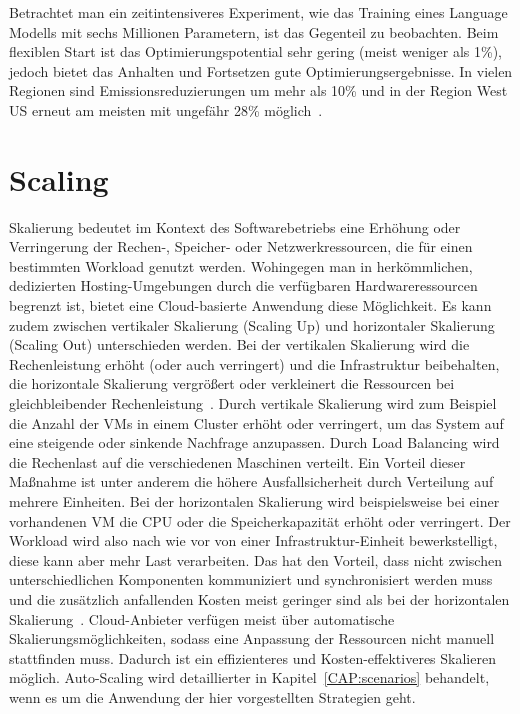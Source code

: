 Betrachtet man ein zeitintensiveres Experiment, wie das Training eines Language Modells mit sechs Millionen Parametern, ist das Gegenteil zu beobachten.
Beim flexiblen Start ist das Optimierungspotential sehr gering (meist weniger als 1\%), jedoch bietet das Anhalten und Fortsetzen gute Optimierungsergebnisse.
In vielen Regionen sind Emissionsreduzierungen um mehr als 10\% und in der Region West US erneut am meisten mit ungefähr 28\% möglich~\cite{Dodge.06212022}.

\section{Scaling}
Skalierung bedeutet im Kontext des Softwarebetriebs eine Erhöhung oder Verringerung der Rechen-, Speicher- oder Netzwerkressourcen, die für einen bestimmten Workload genutzt werden.
Wohingegen man in herkömmlichen, dedizierten Hosting-Umgebungen durch die verfügbaren Hardwareressourcen begrenzt ist, bietet eine Cloud-basierte Anwendung diese Möglichkeit.
Es kann zudem zwischen vertikaler Skalierung (Scaling Up) und horizontaler Skalierung (Scaling Out) unterschieden werden.
Bei der vertikalen Skalierung wird die Rechenleistung erhöht (oder auch verringert) und die Infrastruktur beibehalten, die horizontale Skalierung vergrößert oder verkleinert die Ressourcen bei gleichbleibender Rechenleistung~\cite{AlibabaCloudCommunity.20240118T09:19:15.000Z}.
Durch vertikale Skalierung wird zum Beispiel die Anzahl der \acp{VM} in einem Cluster erhöht oder verringert, um das System auf eine steigende oder sinkende Nachfrage anzupassen.
Durch Load Balancing wird die Rechenlast auf die verschiedenen Maschinen verteilt.
Ein Vorteil dieser Maßnahme ist unter anderem die höhere Ausfallsicherheit durch Verteilung auf mehrere Einheiten.
Bei der horizontalen Skalierung wird beispielsweise bei einer vorhandenen \ac{VM} die \ac{CPU} oder die Speicherkapazität erhöht oder verringert.
Der Workload wird also nach wie vor von einer Infrastruktur-Einheit bewerkstelligt, diese kann aber mehr Last verarbeiten.
Das hat den Vorteil, dass nicht zwischen unterschiedlichen Komponenten kommuniziert und synchronisiert werden muss und die zusätzlich anfallenden Kosten meist geringer sind als bei der horizontalen Skalierung~\cite{Slingerland.2023}.
Cloud-Anbieter verfügen meist über automatische Skalierungsmöglichkeiten, sodass eine Anpassung der Ressourcen nicht manuell stattfinden muss.
Dadurch ist ein effizienteres und Kosten-effektiveres Skalieren möglich.
Auto-Scaling wird detaillierter in Kapitel~\ref{CAP:scenarios} behandelt, wenn es um die Anwendung der hier vorgestellten Strategien geht.
